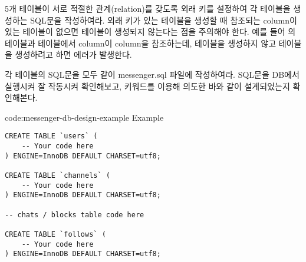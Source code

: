 5개 테이블이 서로 적절한 관계(relation)를 갖도록 외래 키를 설정하여 각 테이블을 생성하는 SQL문을 작성하여라. 외래 키가 있는 테이블을 생성할 때 참조되는 column이 있는 테이블이 없으면 테이블이 생성되지 않는다는 점을 주의해야 한다. 예를 들어 의  테이블과  테이블에서  column이  column을 참조하는데,  테이블을 생성하지 않고  테이블을 생성하려고 하면 에러가 발생한다.

각 테이블의 SQL문을 모두 \과 같이 messenger.sql 파일에 작성하여라. SQL문을 DB에서 실행시켜 잘 작동시켜 확인해보고,  키워드를 이용해 의도한 바와 같이 설계되었는지 확인해본다.

\begin{codeenv}{code:messenger-db-design-example}{ Example}\begin{verbatim}
CREATE TABLE `users` (
    -- Your code here
) ENGINE=InnoDB DEFAULT CHARSET=utf8;

CREATE TABLE `channels` (
    -- Your code here
) ENGINE=InnoDB DEFAULT CHARSET=utf8;

-- chats / blocks table code here

CREATE TABLE `follows` (
    -- Your code here
) ENGINE=InnoDB DEFAULT CHARSET=utf8;
\end{verbatim}
\end{codeenv}

